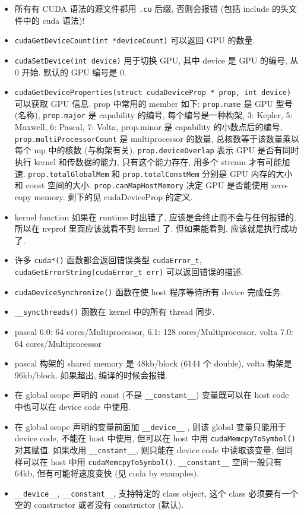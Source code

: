 \begin{itemize}
\item 所有有 CUDA 语法的源文件都用 \verb`.cu` 后缀, 否则会报错 (包括 include 的头文件中的 cuda 语法)!
\item \verb`cudaGetDeviceCount(int *deviceCount)` 可以返回 GPU 的数量.
\item \verb`cudaSetDevice(int device)` 用于切换 GPU, 其中 device 是 GPU 的编号, 从 0 开始. 默认的 GPU 编号是 0.
\item \verb`cudaGetDeviceProperties(struct cudaDeviceProp * prop, int device)` 可以获取 GPU 信息. prop 中常用的 member 如下:
\verb`prop.name` 是 GPU 型号 (名称), \verb`prop.major` 是 capability 的编号, 每个编号是一种构架, 3: Kepler,  5: Maxwell, 6: Pascal, 7: Volta, prop.minor 是 capability 的小数点后的编号, \verb`prop.multiProcessorCount` 是 multiprocessor 的数量, 总核数等于该数量乘以每个 mp 中的核数 (与构架有关), \verb`prop.deviceOverlap` 表示 GPU 是否有同时执行 kernel 和传数据的能力, 只有这个能力存在, 用多个 stream 才有可能加速.
\verb`prop.totalGlobalMem` 和 \verb`prop.totalConstMem` 分别是 GPU 内存的大小和 const 空间的大小. \verb`prop.canMapHostMemory` 决定 GPU 是否能使用 zero-copy memory. 剩下的见 cudaDeviceProp 的定义.
\item kernel function 如果在 runtime 时出错了, 应该是会终止而不会与任何报错的, 所以在 nvprof 里面应该就看不到 kernel 了. 但如果能看到, 应该就是执行成功了.
\item 许多 \verb`cuda*()` 函数都会返回错误类型 \verb`cudaError_t`, \verb`cudaGetErrorString(cudaError_t err)` 可以返回错误的描述.
\item \verb`cudaDeviceSynchronize()` 函数在使 host 程序等待所有 device 完成任务.
\item \verb`__syncthreads()` 函数在 kernel 中的所有 thread 同步.
\item pascal 6.0: 64 cores/Multiprocessor, 6.1: 128 cores/Multiprocessor.   volta 7.0: 64 cores/Multiprocessor
\item pascal 构架的 shared memory 是 48kb/block (6144 个 double), volta 构架是 96kb/block. 如果超出, 编译的时候会报错.
\item 在 global scope 声明的 const (不是 \verb`__constant__`) 变量既可以在 host code 中也可以在 device code 中使用.
\item 在 global scope 声明的变量前面加 \verb`__device__` , 则该 global 变量只能用于 device code, 不能在 host 中使用, 但可以在 host 中用 \verb`cudaMemcpyToSymbol()` 对其赋值. 如果改用 \verb`__cnstant__`, 则只能在 device code 中读取该变量, 但同样可以在 host 中用 \verb`cudaMemcpyToSymbol()`. \verb`__constant__` 空间一般只有 64kb, 但有可能将速度变快 (见 cuda by examples).
\item \verb`__device__`, \verb`__constant__`, 支持特定的 class object, 这个 class 必须要有一个空的 constructor 或者没有 constructor (默认).


\end{itemize}
